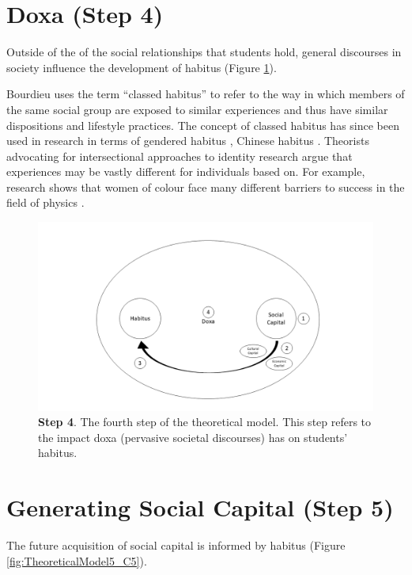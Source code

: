 \section{Doxa (Step 4)}
Outside of the of the social relationships that students hold, general discourses in society influence the development of habitus (Figure \ref{fig:TheoreticalModel4_C5}). 

Bourdieu uses the term ``classed habitus'' to refer to the way in which members of the same social group are exposed to similar experiences and thus have similar dispositions and lifestyle practices. The concept of classed habitus has since been used in research in terms of gendered habitus \citep{Reay_2004}, Chinese habitus \citep{Mu2014}. Theorists advocating for intersectional approaches to identity research argue that experiences may be vastly different for individuals based on. For example, research shows that women of colour face many different barriers to success in the field of physics \cite{ong2005body}.

\begin{figure}[ht]
\centering
\includegraphics[width=\textwidth]{C5 - Understanding Capital Accumulation/HabitusSocCap_TheoreticalModel4.png}
\caption{\label{fig:TheoreticalModel4_C5}\textbf{Step 4}. The fourth step of the theoretical model. This step refers to the impact doxa (pervasive societal discourses) has on students' habitus.}
\end{figure}

\section{Generating Social Capital (Step 5)}
The future acquisition of social capital is informed by habitus (Figure \ref{fig:TheoreticalModel5_C5}). 

